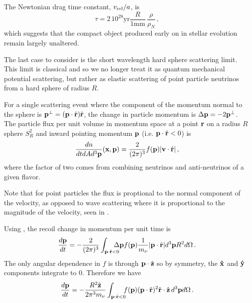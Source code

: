 The Newtonian drag time constant, $v_{\rm rel}/a$, is
\begin{equation}
\tau= 2\,10^{28}\text{yr}\frac{R}{1\text{mm}}\,\frac{\rho}{\rho_N}\,,
\end{equation}
which suggests that the compact object produced early on in stellar evolution remain largely unaltered.

The last case to consider is the short wavelength hard sphere scattering limit.  This limit is classical and so we no longer treat it as quantum mechanical potential scattering, but rather as elastic scattering of point particle neutrinos from a hard sphere of radius $R$.  

For a single scattering event where the component of the momentum normal to the sphere is ${\bf p}^\perp=({\bf p}\cdot \hat {\bf r}) \hat {\bf r}$, the change in particle momentum is  $\Delta {\bf p}=-2{\bf p}^\perp$. The particle flux per unit volume in momentum space at a point ${\bf r}$ on a radius $R$ sphere $S_R^2$ and inward pointing momentum ${\bf p}$ (i.e. ${\bf p}\cdot \hat{\bf  r}<0$) is
\begin{equation}\label{dnClassical}
\frac{dn}{dtd Ad^3{\bf p}}({\bf x},{\bf p})=\frac{2}{(2\pi)^3}f({\bf p})|{\bf v}\cdot \hat{\bf r}|\,,
\end{equation}
where the factor of two comes from combining neutrinos and anti-neutrinos of a given flavor.  

Note that for point particles the flux is proptional to the normal component of the velocity, as opposed to wave scattering where it is proportional to the magnitude of the velocity, seen in .

Using , the recoil change in momentum per unit time is  
\begin{equation}
\frac{d{\bf p}}{dt}= -\frac{2}{(2\pi)^3}\int_{{\bf p}\cdot \hat{\bf r}<0} \!\!\!\!\!\!\Delta {\bf p}  f({\bf p}) \frac{1}{m_\nu}|{\bf p}\cdot \hat{\bf r}| d^3{\bf p}R^2d\Omega\,.
\end{equation}
The only angular dependence in $f$ is through ${\bf p}\cdot \hat {\bf z}$ so by symmetry, the ${\bf \hat x}$ and ${\bf \hat y}$ components integrate to $0$.  Therefore we have
\begin{equation}
\frac{d{\bf p}}{dt}=-\frac{R^2\hat{\bf z}}{2\pi^3m_\nu}\int_{{\bf p}\cdot \hat{\bf r}<0}\!\!\!   f({\bf p}) ({\bf p}\cdot \hat{\bf r})^2 \hat {\bf r}\cdot\hat{\bf z}\, d^3{\bf p}d\Omega\,.  
\end{equation}

